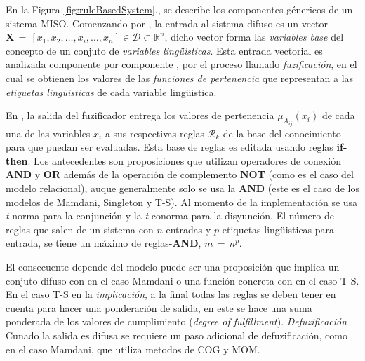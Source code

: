 \documentclass[10pt,onecolumn,twoside,letterpaper]{article}
\begin{document}
En la Figura \ref{fig:ruleBasedSystem}., se describe los componentes g\'enericos de un sistema MISO. Comenzando por , la entrada al sistema difuso es un vector $\mathbf{X}\,=\,\left[x_1,x_2,\ldots,x_i,\ldots,x_n\right]\in\mathcal{D}\subset\mathbb{R}^n$, dicho vector forma las \emph{variables base} del concepto de un conjuto de \emph{variables ling\"uisticas}. Esta entrada vectorial es analizada componente por componente , por el proceso llamado \emph{fuzificaci\'on}, en el cual se obtienen los valores de las \emph{funciones de pertenencia} que representan a las \emph{etiquetas ling\"uisticas} de cada variable ling\"uistica.\\
\par En , la salida del fuzificador entrega los valores de pertenencia $\mu_{A_{ij}}(x_i)$ de cada una de las variables $x_i$ a sus respectivas reglas $\mathcal{R}_k$ de la base del conocimiento para que puedan ser evaluadas. Esta base de reglas es editada usando reglas \textbf{if-then}. Los antecedentes  son proposiciones que utilizan operadores de conexi\'on \textbf{AND} y \textbf{OR} adem\'as de la operaci\'on de complemento \textbf{NOT} (como es el caso del modelo relacional), auque generalmente solo se usa la \textbf{AND} (este es el caso de los modelos de Mamdani, Singleton y T-S).  Al momento de la implementaci\'on se usa \emph{t}-norma para la conjunci\'on y la \emph{t}-conorma para la disyunci\'on. El n\'umero de reglas que salen de un sistema con $n$ entradas y $p$ etiquetas ling\"uisticas para entrada, se tiene un m\'aximo de reglas-\textbf{AND}, $m\,=\,n^p$.\\
\par {} El consecuente depende del modelo puede ser una proposici\'on que implica un conjuto difuso con en el caso Mamdani o una funci\'on concreta con en el caso T-S. En el caso T-S en la \emph{implicaci\'on},  a la final todas las reglas se deben tener en cuenta para hacer una ponderaci\'on de salida, en este se hace una suma ponderada de los valores de cumplimiento (\emph{degree of fulfillment}). \emph{Defuzificaci\'on}  Cunado la salida es difusa se requiere un paso adicional de defuzificaci\'on, como en el caso Mamdani, que utiliza metodos de COG y MOM.
\end{document}
